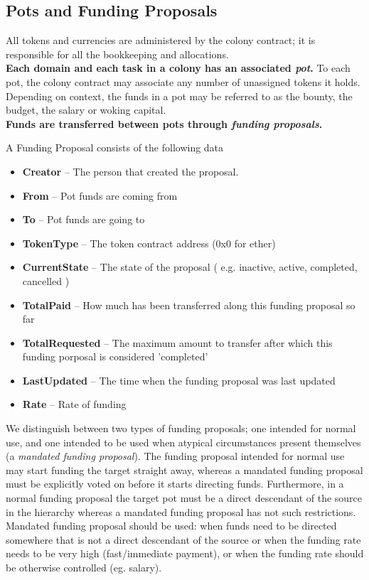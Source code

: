 \subsection{Pots and Funding Proposals}
All tokens and currencies are administered by the colony contract; it is responsible for all the bookkeeping and allocations.\\
\textbf{Each domain and each task in a colony has an associated \emph{pot}.} To each pot, the colony contract may associate any number of unassigned tokens it holds. Depending on context, the funds in a pot may be referred to as the bounty, the budget, the salary or woking capital.\\
\textbf{Funds are transferred between pots through \emph{funding proposals}.}
\begin{description}
 \item A Funding Proposal consists of the following data
 \begin{itemize}
  \item \textbf{Creator}	--	The person that created the proposal.
  \item \textbf{From}	--	Pot funds are coming from
  \item \textbf{To}	--	Pot funds are going to
  \item \textbf{TokenType}	--	The token contract address (0x0 for ether)
  \item \textbf{CurrentState}	--	The state of the proposal ( e.g. inactive, active, completed, cancelled )
  \item \textbf{TotalPaid}	--	How much has been transferred along this funding proposal so far
  \item \textbf{TotalRequested}	--	The maximum amount to transfer after which this funding porposal is considered 'completed'
  \item \textbf{LastUpdated}	--	The time when the funding proposal was last updated
  \item \textbf{Rate}	--	Rate of funding
 \end{itemize}

\end{description}
We distinguish between two types of funding proposals; one intended for normal use, and one intended to be used when atypical circumstances present themselves (a \emph{mandated funding proposal}). The funding proposal intended for normal use may start funding the target straight away, whereas a mandated funding proposal must be explicitly voted on before it starts directing funds. Furthermore, in a normal funding proposal the target pot must be a direct descendant of the source in the hierarchy whereas a mandated funding proposal has not such restrictions.\\
Mandated funding proposal should be used: when funds need to be directed somewhere that is not a direct descendant of the source or when the funding rate needs to be very high (fast/immediate payment), or when the funding rate should be otherwise controlled (eg. salary).\\

